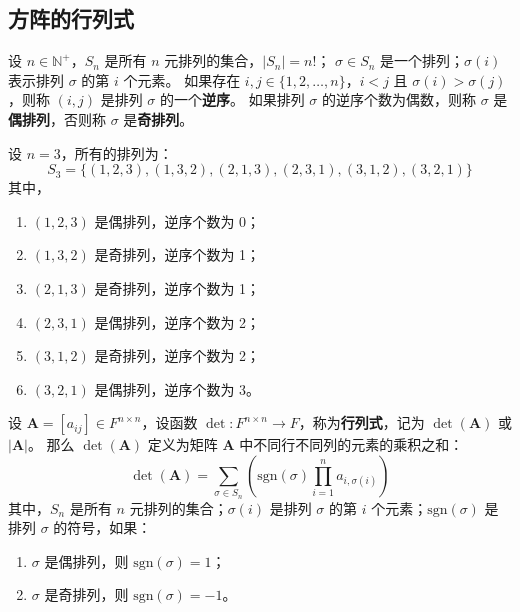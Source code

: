 \vspace{1em}
\subsection{方阵的行列式}

\begin{definition}[排列 Permutation]
    设 $n\in\mathbb{N}^+$，$S_n$ 是所有 $n$ 元排列的集合，$|S_n|=n!$；
    $\sigma \in S_n$ 是一个排列；$\sigma(i)$ 表示排列 $\sigma$ 的第 $i$ 个元素。
    如果存在 $i,j\in\{1,2,\ldots,n\}$，$i<j$ 且 $\sigma(i)>\sigma(j)$，则称 $(i,j)$ 是排列 $\sigma$ 的一个\textbf{逆序}。
    如果排列 $\sigma$ 的逆序个数为偶数，则称 $\sigma$ 是\textbf{偶排列}，否则称 $\sigma$ 是\textbf{奇排列}。
\end{definition}

\begin{example}
    设 $n=3$，所有的排列为：
    \[
        S_3 = \{(1,2,3),(1,3,2),(2,1,3),(2,3,1),(3,1,2),(3,2,1)\}
    \]
    其中，
    \begin{enumerate}
        \item $(1,2,3)$ 是偶排列，逆序个数为 0；
        \item $(1,3,2)$ 是奇排列，逆序个数为 1；
        \item $(2,1,3)$ 是奇排列，逆序个数为 1；
        \item $(2,3,1)$ 是偶排列，逆序个数为 2；
        \item $(3,1,2)$ 是奇排列，逆序个数为 2；
        \item $(3,2,1)$ 是偶排列，逆序个数为 3。
    \end{enumerate}
\end{example}
\vspace{1em}

\begin{definition}
    设 $\mathbf{A} = [a_{ij}] \in F^{n \times n}$，设函数 $\det : F^{n \times n} \to F$，称为\textbf{行列式}，记为 $\det(\mathbf{A})$ 或 $|\mathbf{A}|$。
    那么 $\det(\mathbf{A})$ 定义为矩阵 $\mathbf{A}$ 中不同行不同列的元素的乘积之和：
    \[
        \det(\mathbf{A}) = \sum_{\sigma \in S_n} \left( \mathrm{sgn}(\sigma) \prod_{i=1}^{n} a_{i,\sigma(i)} \right)
    \]
    其中，$S_n$ 是所有 $n$ 元排列的集合；$\sigma(i)$ 是排列 $\sigma$ 的第 $i$ 个元素；$\mathrm{sgn}(\sigma)$ 是排列 $\sigma$ 的符号，如果：
    \begin{enumerate}
        \item $\sigma$ 是偶排列，则 $\mathrm{sgn}(\sigma) = 1$；
        \item $\sigma$ 是奇排列，则 $\mathrm{sgn}(\sigma) = -1$。
    \end{enumerate}
\end{definition}

